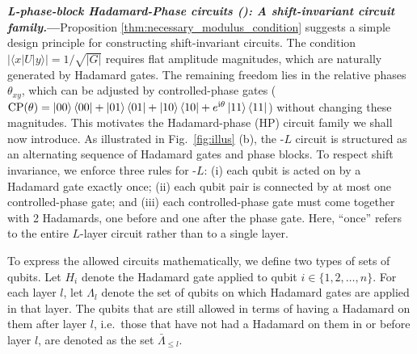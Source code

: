 \documentclass[reprint, aps, prl, superscriptaddress]{revtex4-2}
\renewcommand{\section}[1]{\par\medskip\noindent\textbf{{\textit{#1.}---}}}
\newcommand{\ii}{\mathrm{i}}
\newcommand{\myqc}{\text{HP}}
\newcommand{\Lambdacomp}[1]{\bar{\Lambda}_{\leq #1}}
\begin{document}
\section{L-phase-block Hadamard-Phase circuits (\myqc): A shift-invariant circuit family}Proposition \ref{thm:necessary_modulus_condition} suggests a simple design principle for constructing shift-invariant circuits. The condition \(|\langle x|U|y\rangle|=1/\sqrt{|G|}\) requires flat amplitude magnitudes, which are naturally generated by Hadamard gates. The remaining freedom lies in the relative phases \(\theta_{xy}\), which can be adjusted by controlled-phase gates ($\mathrm{CP}(\theta)=\ket{00}\bra{00}+\ket{01}\bra{01}+\ket{10}\bra{10}+e^{\ii\theta}\ket{11}\bra{11}$) without changing these magnitudes. This motivates the Hadamard-phase (HP) circuit family we shall now introduce. As illustrated in Fig.~\ref{fig:illus} (b), the \myqc-$L$ circuit is structured as an alternating sequence of Hadamard gates and phase blocks. To respect shift invariance, we enforce three rules for \myqc-$L$: (i) each qubit is acted on by a Hadamard gate exactly once; (ii) each qubit pair is connected by at most one controlled-phase gate; and (iii) each controlled-phase gate must come together with 2 Hadamards, one before and one after the phase gate. Here, ``once'' refers to the entire $L$-layer circuit rather than to a single layer. 


To express the allowed circuits mathematically, we define two types of sets of qubits.
Let \(H_i\) denote the Hadamard gate applied to qubit
\(i\in\{1,2,\ldots,n\}\). For each layer \(l\), let
\(\Lambda_l\) denote the set of qubits on which
Hadamard gates are applied in that layer. The qubits that are still allowed in terms of having a Hadamard on them after layer $l$, i.e.\ those that have not had a Hadamard on them in or before layer $l$, are denoted as the set \(\Lambdacomp{l}\).
\end{document}
